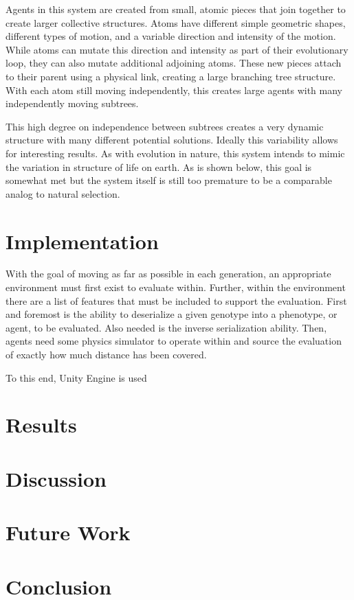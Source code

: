 \documentclass[runningheads]{llncs}
\begin{document}
Agents in this system are created from small, atomic pieces that join together to create larger collective structures.
Atoms have different simple geometric shapes, different types of motion, and a variable direction and intensity of the motion.
While atoms can mutate this direction and intensity as part of their evolutionary loop, they can also mutate additional adjoining atoms.
These new pieces attach to their parent using a physical link, creating a large branching tree structure.
With each atom still moving independently, this creates large agents with many independently moving subtrees.

This high degree on independence between subtrees creates a very dynamic structure with many different potential solutions.
Ideally this variability allows for interesting results.
As with evolution in nature, this system intends to mimic the variation in structure of life on earth.
As is shown below, this goal is somewhat met but the system itself is still too premature to be a comparable analog to natural selection.

\section{Implementation}
With the goal of moving as far as possible in each generation, an appropriate environment must first exist to evaluate within.
Further, within the environment there are a list of features that must be included to support the evaluation.
First and foremost is the ability to deserialize a given genotype into a phenotype, or agent, to be evaluated.
Also needed is the inverse serialization ability.
Then, agents need some physics simulator to operate within and source the evaluation of exactly how much distance has been covered.

To this end, Unity Engine is used 

\section{Results}

\section{Discussion}

\section{Future Work}

\section{Conclusion}
\end{document}
